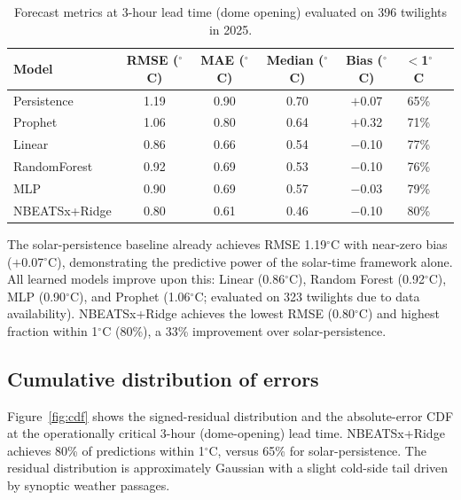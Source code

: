 \documentclass[]{spie}  %
\newcommand{\degC}{$^{\circ}$C}
\begin{document}
\begin{table}[htb!]
\centering
\small
\caption{Forecast metrics at 3-hour lead time (dome opening) evaluated on 396 twilights in 2025.}
\label{tab:3h_metrics}
\begin{tabular}{lcccccc}
\toprule
Model & RMSE (\degC{}) & MAE (\degC{}) & Median (\degC{}) & Bias (\degC{}) & $<$1\degC{} \\
\midrule
Persistence       & 1.19 & 0.90 & 0.70 & $+$0.07 & 65\% \\
Prophet           & 1.06 & 0.80 & 0.64 & $+$0.32 & 71\% \\
Linear            & 0.86 & 0.66 & 0.54 & $-$0.10 & 77\% \\
RandomForest      & 0.92 & 0.69 & 0.53 & $-$0.10 & 76\% \\
MLP               & 0.90 & 0.69 & 0.57 & $-$0.03 & 79\% \\
\midrule
NBEATSx+Ridge     & 0.80 & 0.61 & 0.46 & $-$0.10 & 80\% \\
\bottomrule
\end{tabular}
\end{table}

The solar-persistence baseline already achieves RMSE 1.19\degC{} with near-zero bias ($+$0.07\degC{}), demonstrating the predictive power of the solar-time framework alone. All learned models improve upon this: Linear (0.86\degC{}), Random Forest (0.92\degC{}), MLP (0.90\degC{}), and Prophet (1.06\degC{}; evaluated on 323 twilights due to data availability). NBEATSx+Ridge achieves the lowest RMSE (0.80\degC{}) and highest fraction within 1\degC{} (80\%), a 33\% improvement over solar-persistence.

\subsection{Cumulative distribution of errors}
\label{sec:results:cdf}

Figure~\ref{fig:cdf} shows the signed-residual distribution and the absolute-error CDF at the operationally critical 3-hour (dome-opening) lead time. NBEATSx+Ridge achieves 80\% of predictions within 1\degC{}, versus 65\% for solar-persistence. The residual distribution is approximately Gaussian with a slight cold-side tail driven by synoptic weather passages.
\end{document}
